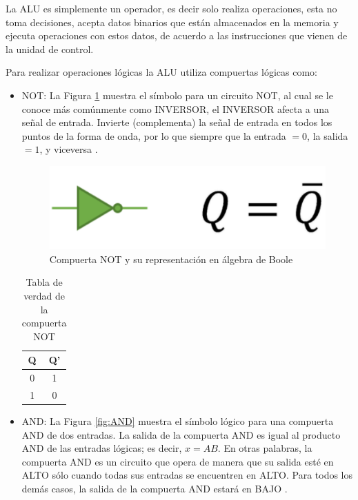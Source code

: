 \documentclass[journal]{IEEEtran}
\begin{document}
	La ALU es simplemente un operador, es decir solo realiza operaciones, esta no toma decisiones, acepta datos binarios que están almacenados en la memoria y ejecuta operaciones con estos datos, de acuerdo a las instrucciones que vienen de la unidad de control.
	
	Para realizar operaciones lógicas la ALU utiliza compuertas lógicas como:
	
	\begin{itemize}
		\item NOT: La Figura \ref{fig:NOT} muestra el símbolo para un circuito NOT, al cual se le conoce más comúnmente como INVERSOR, el INVERSOR afecta a una señal de entrada. Invierte (complementa) la señal de entrada en todos los puntos de la forma de onda, por lo que siempre que la entrada $= 0$, la salida $= 1$, y viceversa \cite{Tocci2007}.
		
		\begin{figure}[!htb]
			\centering
			\includegraphics[scale = 0.35]{img/NOT.png}
			\caption{Compuerta NOT y su representación en álgebra de Boole \cite{logicbus}}
			\label{fig:NOT}
		\end{figure}
	
		\begin{table}[!htb]
			\centering
			\begin{tabular}{|c|c|}
				\hline
				Q & Q' \\
				\hline
				\hline
				0 & 1 \\
				\hline
				1 & 0 \\
				\hline
			\end{tabular}
			\caption{Tabla de verdad de la compuerta NOT}
			\label{tab:NOT}
		\end{table}
		
		\item AND: La Figura \ref{fig:AND} muestra el símbolo lógico para una compuerta AND de dos entradas. La salida de la compuerta AND es igual al producto AND de las entradas lógicas; es decir, $x=AB$. En otras palabras, la compuerta AND es un circuito que opera de manera que su salida esté en ALTO sólo cuando todas sus entradas se encuentren en ALTO. Para todos los demás casos, la salida de la compuerta AND estará en BAJO \cite{Tocci2007}.
		

\end{itemize}
\end{document}
